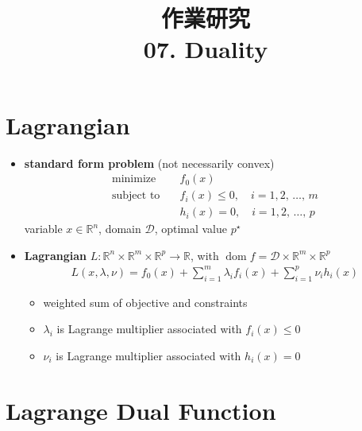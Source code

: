 \documentclass[11pt]{extarticle}
\newcommand{\ds}{\displaystyle}
\DeclareMathOperator*{\dom}{dom}
\theoremstyle{definition}
\begin{document}
\title{\texorpdfstring{\vspace{15mm} 作業研究\\ 07. Duality}{作業研究\\ 07. Duality}} 
\author{}
\date{}
\maketitle
\newpage

\section*{Lagrangian}

\begin{itemize}
  \item {\bf standard form problem} (not necessarily convex)
    \begin{align*}
      \text{minimize}\quad &f_0(x) \\
      \text{subject to}\quad &f_i(x)\leqslant 0, \quad i = 1, 2,\,\ldots,\,m \\
      \qquad\qquad &h_i(x) = 0, \quad i = 1, 2,\,\ldots,\,p 
    \end{align*}
    variable $x\in\mathbb{R}^n$, domain $\mathcal{D}$, optimal value $p^\star$
  \item {\bf Lagrangian} $L:\mathbb{R}^n\times\mathbb{R}^m\times\mathbb{R}^p\to\mathbb{R}$, with $\dom f = \mathcal{D}\times\mathbb{R}^m\times\mathbb{R}^p$
    \begin{align*}
      L(x,\lambda,\nu) = f_0(x) + \sum_{i=1}^m\lambda_i f_i(x) + \sum_{i=1}^p\nu_i h_i(x)
    \end{align*}
    \begin{itemize}
      \item weighted sum of objective and constraints 
      \item $\lambda_i$ is Lagrange multiplier associated with $\ds f_i(x)\leqslant 0$
      \item $\nu_i$ is Lagrange multiplier associated with $\ds h_i(x) = 0$
    \end{itemize}
\end{itemize}

\newpage

\section*{Lagrange Dual Function}
\end{document}
